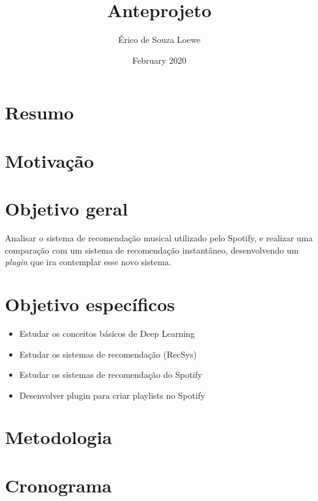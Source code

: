 \documentclass{article}
\title{Anteprojeto}
\author{Érico de Souza Loewe}
\date{February 2020}
\begin{document}
\maketitle

\section{Resumo}

\section{Motivação}

\section{Objetivo geral}

Analisar o sistema de recomendação musical utilizado pelo Spotify, e realizar uma comparação com um sistema de recomendação instantâneo, desenvolvendo um \textit{plugin} que ira contemplar esse novo sistema.

\section{Objetivo específicos}

\begin{itemize}
\item Estudar os conceitos básicos de Deep Learning
\item Estudar os sistemas de recomendação (RecSys)
\item Estudar os sistemas de recomendação do Spotify
\item Desenvolver plugin para criar playlists no Spotify
\end{itemize}

\section{Metodologia}

\section{Cronograma}
\end{document}
